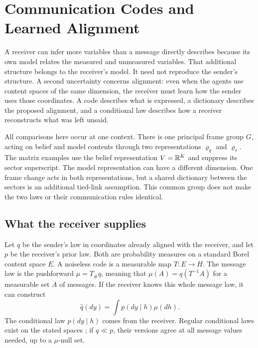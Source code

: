\chapter{Communication Codes and Learned Alignment}
\label{c17:communication-links}

A receiver can infer more variables than a message directly describes because its own model relates the measured and unmeasured variables. That additional structure belongs to the receiver's model. It need not reproduce the sender's structure. A second uncertainty concerns alignment: even when the agents use content spaces of the same dimension, the receiver must learn how the sender uses those coordinates. A code describes what is expressed, a dictionary describes the proposed alignment, and a conditional law describes how a receiver reconstructs what was left unsaid.

All comparisons here occur at one context. There is one principal frame group $G$, acting on belief and model contents through two representations $\varrho_q$ and $\varrho_s$. The matrix examples use the belief representation $V=\mathbb R^K$ and suppress its sector superscript. The model representation can have a different dimension. One frame change acts in both representations, but a shared dictionary between the sectors is an additional tied-link assumption. This common group does not make the two laws or their communication rules identical.

\section{What the receiver supplies}

Let $q$ be the sender's law in coordinates already aligned with the receiver, and let $p$ be the receiver's prior law. Both are probability measures on a standard Borel content space $E$. A noiseless code is a measurable map $T:E\to H$. The message law is the pushforward $\mu=T_\#q$, meaning that $\mu(A)=q(T^{-1}A)$ for a measurable set $A$ of messages. If the receiver knows this whole message law, it can construct
\begin{equation}
\widehat q(dy)=\int p(dy\mid h)\mu(dh).
\label{c17:reconstruction}
\end{equation}
The conditional law $p(dy\mid h)$ comes from the receiver. Regular conditional laws exist on the stated spaces \citep{Kallenberg2021}; if $q\ll p$, their versions agree at all message values needed, up to a $\mu$-null set.

